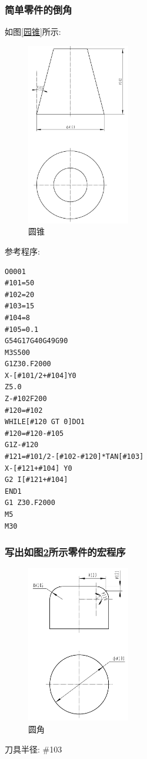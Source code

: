 \subsubsection{简单零件的倒角}
如图\ref{园锥}所示:
\begin{figure}
	\centering	\includegraphics[width=0.4\textwidth]{images/13-1.jpg}
	\caption{圆锥} \label{圆锥}
\end{figure}
参考程序:
\begin{lstlisting}
O0001
#101=50
#102=20
#103=15
#104=8
#105=0.1
G54G17G40G49G90
M3S500
G1Z30.F2000
X-[#101/2+#104]Y0
Z5.0
Z-#102F200
#120=#102
WHILE[#120 GT 0]DO1
#120=#120-#105
G1Z-#120
#121=#101/2-[#102-#120]*TAN[#103]
X-[#121+#104] Y0
G2 I[#121+#104]
END1
G1 Z30.F2000
M5
M30
\end{lstlisting}
\subsubsection{写出如图\ref{圆角}所示零件的宏程序}
\begin{figure}
	\centering	\includegraphics[width=0.4\textwidth]{images/13-2.jpg}
	\caption{圆角} \label{圆角}
\end{figure}
刀具半径: \#103

